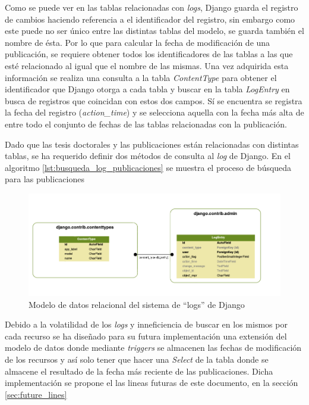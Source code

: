 Como se puede ver en las tablas relacionadas con \textit{logs}, Django guarda el registro de cambios haciendo referencia a el identificador del registro, sin embargo como este puede no ser único entre las distintas tablas del modelo, se guarda también el nombre de ésta. Por lo que para calcular la fecha de modificación de una publicación, se requiere obtener todos los identificadores de las tablas a las que esté relacionado al igual que el nombre de las mismas. Una vez adquirida esta información se realiza una consulta a la tabla \textit{ContentType} para obtener el identificador que Django otorga a cada tabla y buscar en la tabla \textit{LogEntry} en busca de registros que coincidan con estos dos campos. Sí se encuentra se registra la fecha del registro (\textit{action\_time}) y se selecciona aquella con la fecha más alta de entre todo el conjunto de fechas de las tablas relacionadas con la publicación.

Dado que las tesis doctorales y las publicaciones están relacionadas con distintas tablas, se ha requerido definir dos métodos de consulta al \textit{log} de Django. En el algoritmo \ref{lst:busqueda_log_publicaciones} se muestra el proceso de búsqueda para las publicaciones

\begin{figure}[!htbp]
	\centering
	\includegraphics[scale=0.45]{fig/dbmodel/django_log}
	\caption{Modelo de datos relacional del sistema de ``logs'' de Django}
	\label{fig:logsmodel}
\end{figure}



Debido a la volatilidad de los \textit{logs} y inneficiencia de buscar en los mismos por cada recurso se ha diseñado para su futura implementación una extensión del modelo de datos donde mediante \textit{triggers} se almacenen las fechas de modificación de los recursos  y así solo tener que hacer una \textit{Select} de la tabla donde se almacene el resultado de la fecha más reciente de las publicaciones.
Dicha implementación se propone el las lineas futuras de este documento, en la sección \ref{sec:future_lines}